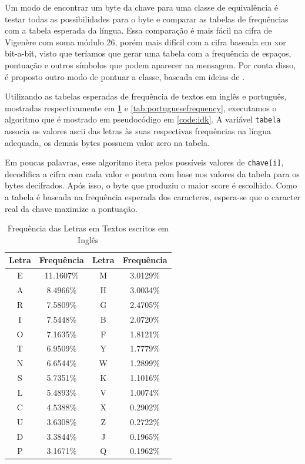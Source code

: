 \documentclass[conference]{IEEEtran}
\begin{document}
Um modo de encontrar um byte da chave para uma classe de equivalência é testar
todas as possibilidades para o byte e comparar as tabelas de frequências com a tabela
esperada da língua. Essa comparação é mais fácil na cifra de Vigenère com soma
módulo 26, porém mais difícil com a cifra baseada em xor bit-a-bit, visto que
teríamos que gerar uma tabela com a frequência de espaços, pontuação e outros
símbolos que podem aparecer na mensagem. Por conta disso, é proposto outro modo
de pontuar a classe, baseada em ideias de \cite{breaking-the-cipher}.

Utilizando as tabelas esperadas de frequência de textos em inglês e português,
mostradas respectivamente em \ref{tab:englishfrequency} e
\ref{tab:portuguesefrequency}, executamos o algoritmo que é mostrado em
pseudocódigo em \ref{code:idk}. A variável \verb|tabela| associa os valores
ascii das letras às suas respectivas frequências na língua adequada, os demais
bytes possuem valor zero na tabela.

Em poucas palavras, esse algoritmo itera pelos possíveis valores de
\verb|chave[i]|, decodifica a cifra com cada valor e pontua com base nos valores
da tabela para os bytes decifrados. Após isso, o byte que produziu o maior score
é escolhido. Como a tabela é baseada na frequência esperada dos caracteres,
espera-se que o caracter real da chave maximize a pontuação.

\begin{table}[htbp]
\caption{Frequência das Letras em Textos escritos em Inglês}
\begin{center}
\begin{tabular}{|c|c|c|c|}
\hline
    Letra & Frequência & Letra & Frequência \\
\hline
    E & 11.1607\% & M & 3.0129\% \\
    A & 8.4966\% & H & 3.0034\% \\
    R & 7.5809\% & G & 2.4705\% \\
    I & 7.5448\% & B & 2.0720\% \\
    O & 7.1635\% & F & 1.8121\% \\
    T & 6.9509\% & Y & 1.7779\% \\
    N & 6.6544\% & W & 1.2899\% \\
    S & 5.7351\% & K & 1.1016\% \\
    L & 5.4893\% & V & 1.0074\% \\
    C & 4.5388\% & X & 0.2902\% \\
    U & 3.6308\% & Z & 0.2722\% \\
    D & 3.3844\% & J & 0.1965\% \\
    P & 3.1671\% & Q & 0.1962\% \\
\hline
\end{tabular}
\label{tab:englishfrequency}
\end{center}
\end{table}
\end{document}
